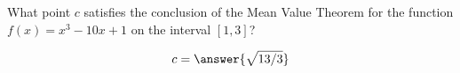 \documentclass{ximera}
\author{Steven Gubkin}
\begin{document}
\begin{exercise}



What point $c$ satisfies the conclusion of the Mean Value Theorem for the function $f(x) = x^3-10x+1$ on the interval
$[1,3]$?

\begin{prompt}
	$$c = \answer{\sqrt{13/3}}$$
\end{prompt}

\end{exercise}
\end{document}
